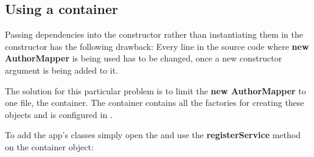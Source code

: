 \documentclass[letterpaper,10pt,english]{sphinxmanual}
\begin{document}
\subsection{Using a container}
\label{app/container:using-a-container}
Passing dependencies into the constructor rather than instantiating them in the constructor has the following drawback: Every line in the source code where \textbf{new AuthorMapper} is being used has to be changed, once a new constructor argument is being added to it.

The solution for this particular problem is to limit the \textbf{new AuthorMapper} to one file, the container. The container contains all the factories for creating these objects and is configured in .

To add the app's classes simply open the  and use the \textbf{registerService} method on the container object:
\end{document}
